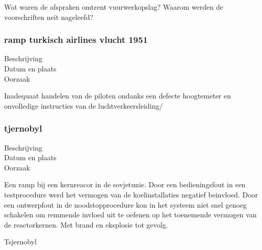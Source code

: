 \cite{boogers092002RampenRegelsRichtlijnen}
 
Wat waren de afspraken omtrent vuurwerkopslag?
Waarom werden de voorschriften neit nageleefd?
\subsubsection{ramp turkisch airlines vlucht 1951}

	\begin{description}
	\item[Beschrijving]
	\item[Datum en plaats] 
	\item[Oorzaak]
\end{description}
Inadequaat handelen van de piloten ondanks een defecte hoogtemeter en onvolledige instructies van de luchtverkeersleiding/
 
\cite{catsr25022009Boeing737AmsterdamCrash}
 
\cite{zuilen23022019Tijdlijnpoldercrash}
\cite{wikinews04032009techfoutailines1951}
\cite{luchtvaartnieuws21012020boeing737conclusies}
\cite{adformatie280220209communicatiegebreken}
\cite{spinnael25022009onderzoekpolderbaancrash}
\cite{crashTurkishAirlines}
\cite{flightradar24}
\cite{flightstatstracker}
 

\subsubsection{tjernobyl}

	\begin{description}
	\item[Beschrijving]
	\item[Datum en plaats] 
	\item[Oorzaak]
\end{description}
Een ramp bij een kernreacor in de sovjetunie. Door een bedieningsfout in een testprocedure werd het vermogen van de koelinstallaties negatief beinvloed. Door een ontwerpfout in de noodstopprocedure kon in het systeem niet snel genoeg schakelen om remmende invloed uit te oefenen op het toenemende vermogen van de reactorkernen. Met brand en eksplosie tot gevolg.
 
\cite{INSAVienna1992Chernobyl}
Tsjernobyl

 

\cite{wikiTjernobyl}

